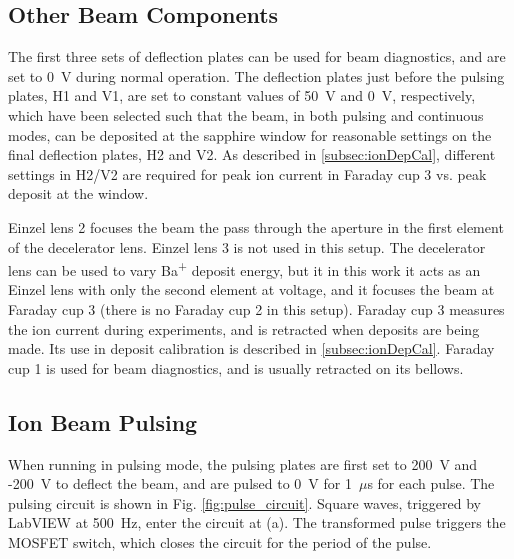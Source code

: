 \subsection{Other Beam Components}

The first three sets of deflection plates can be used for beam diagnostics, and are set to 0~V during normal operation.  The deflection plates just before the pulsing plates, H1 and V1, are set to constant values of 50~V and 0~V, respectively, which have been selected such that the beam, in both pulsing and continuous modes, can be deposited at the sapphire window for reasonable settings on the final deflection plates, H2 and V2.  As described in \ref{subsec:ionDepCal}, different settings in H2/V2 are required for peak ion current in Faraday cup 3 vs. peak deposit at the window.

Einzel lens 2 focuses the beam the pass through the aperture in the first element of the decelerator lens.  Einzel lens 3 is not used in this setup.  The decelerator lens can be used to vary Ba\textsuperscript{+} deposit energy, but it in this work it acts as an Einzel lens with only the second element at voltage, and it focuses the beam at Faraday cup 3 (there is no Faraday cup 2 in this setup).  Faraday cup 3 measures the ion current during experiments, and is retracted when deposits are being made.  Its use in deposit calibration is described in \ref{subsec:ionDepCal}.  Faraday cup 1 is used for beam diagnostics, and is usually retracted on its bellows.  

\subsection{Ion Beam Pulsing}

When running in pulsing mode, the pulsing plates are first set to 200~V and -200~V to deflect the beam, and are pulsed to 0~V for 1~$\mu$s for each pulse.  The pulsing circuit is shown in Fig. \ref{fig:pulse_circuit}.  Square waves, triggered by LabVIEW at 500~Hz, enter the circuit at (a). The transformed pulse triggers the MOSFET switch, which closes the circuit for the period of the pulse.

